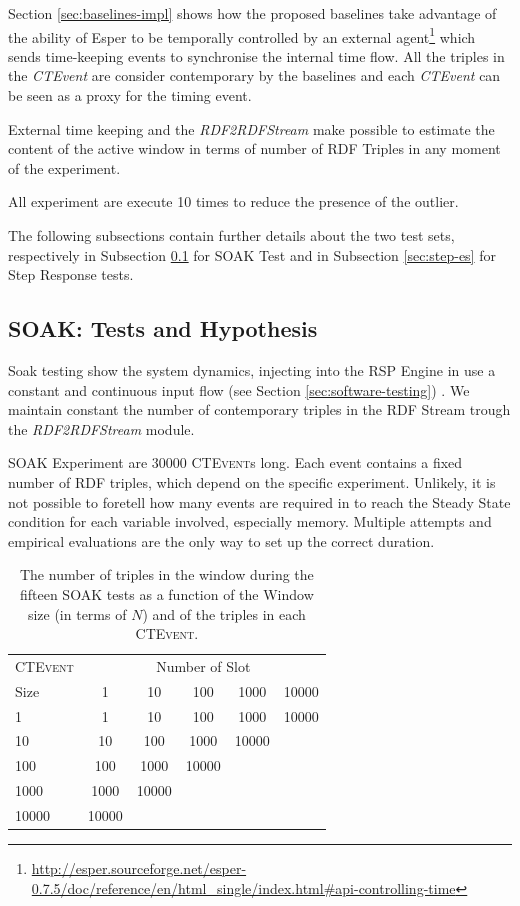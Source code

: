 Section \ref{sec:baselines-impl} shows how the proposed baselines take advantage of the ability of Esper to be temporally controlled by an external agent\footnote{\url{http://esper.sourceforge.net/esper-0.7.5/doc/reference/en/html_single/index.html#api-controlling-time}} which sends time-keeping events to synchronise the internal time flow. All the triples in the \textit{CTEvent} are consider contemporary by the baselines and each \textit{CTEvent} can be seen as a proxy for the timing event. 

External time keeping and the \textit{RDF2RDFStream} make possible to estimate the content of the active window in terms of number of RDF Triples in any moment of the experiment.

All experiment are execute 10 times to reduce the presence of the outlier.

The following subsections contain further details about the two test sets, respectively in Subsection \ref{sec:soak-es} for SOAK Test and in Subsection \ref{sec:step-es} for Step Response tests.

\subsection{SOAK: Tests and Hypothesis}\label{sec:soak-es}

Soak testing show the system dynamics, injecting into the RSP Engine in use a constant and continuous input flow (see Section \ref{sec:software-testing}) . We maintain constant the number of contemporary triples in the RDF Stream trough the \textit{RDF2RDFStream} module. %

SOAK Experiment are 30000 \textsc{CTEvent}s long. Each event contains a fixed number of RDF triples, which depend on the specific experiment. Unlikely, it is not possible to foretell how many events are required in to reach the Steady State condition for each variable involved, especially memory. Multiple attempts and empirical evaluations are the only way to set up the correct duration.

\begin{table}[htb]
\centering
\normalsize
 \begin{tabular}{l| ccccc}
	  	\hline
		\textsc{CTEvent}  &\multicolumn{5}{c}{Number of Slot}  \\
		Size  & 1 & 10 & 100 & 1000&10000 \\
		\hline	
		1 & 1& 10 & 100 & 1000&10000 \\
		10  & 10 & 100 & 1000&10000 \\
		100 & 100&1000&10000  \\
		1000 &1000 & 10000 \\
		10000&10000  \\
		\hline 
	\end{tabular}
	 \vspace{10pt}
	\caption[SOAK Tests Summary Table]{The number of triples in the window during the fifteen SOAK tests as a function of the Window size (in terms of $N$) and of the triples in each \textsc{CTEvent}.}
	\label{tab:soaktests}
\end{table}

